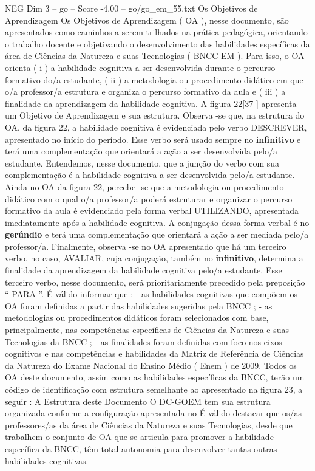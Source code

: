 \begin{textsample}{NEG Dim 3 – go – Score -4.00 – go/go\_em\_55.txt}  \label{ex:f3_neg_241}
Os Objetivos de Aprendizagem Os Objetivos de Aprendizagem ( OA ), nesse documento, são apresentados como caminhos a serem trilhados na prática pedagógica, orientando o trabalho docente e objetivando o desenvolvimento das habilidades específicas da área de Ciências da Natureza e suas Tecnologias ( BNCC-EM ).
Para isso, o OA orienta ( i ) a habilidade cognitiva a ser desenvolvida durante o percurso formativo do/a estudante, ( ii ) a metodologia ou procedimento didático em que o/a professor/a estrutura e organiza o percurso formativo da aula e ( iii ) a finalidade da aprendizagem da habilidade cognitiva.
A figura 22[37 ] apresenta um Objetivo de Aprendizagem e sua estrutura.
Observa -se que, na estrutura do OA, da figura 22, a habilidade cognitiva é evidenciada pelo verbo DESCREVER, apresentado no início do período.
Esse verbo será usado sempre no \textbf{infinitivo} e terá uma complementação que orientará a ação a ser desenvolvida pelo/a estudante.
Entendemos, nesse documento, que a junção do verbo com sua complementação é a habilidade cognitiva a ser desenvolvida pelo/a estudante.
Ainda no OA da figura 22, percebe -se que a metodologia ou procedimento didático com o qual o/a professor/a poderá estruturar e organizar o percurso formativo da aula é evidenciado pela forma verbal UTILIZANDO, apresentada imediatamente após a habilidade cognitiva.
A conjugação dessa forma verbal é no \textbf{gerúndio} e terá uma complementação que orientará a ação a ser mediada pelo/a professor/a.
Finalmente, observa -se no OA apresentado que há um terceiro verbo, no caso, AVALIAR, cuja conjugação, também no \textbf{infinitivo}, determina a finalidade da aprendizagem da habilidade cognitiva pelo/a estudante.
Esse terceiro verbo, nesse documento, será prioritariamente precedido pela preposição “ PARA ”.
É válido informar que : - as habilidades cognitivas que compõem os OA foram definidas a partir das habilidades sugeridas pela BNCC ; - as metodologias ou procedimentos didáticos foram selecionados com base, principalmente, nas competências específicas de Ciências da Natureza e suas Tecnologias da BNCC ; - as finalidades foram definidas com foco nos eixos cognitivos e nas competências e habilidades da Matriz de Referência de Ciências da Natureza do Exame Nacional do Ensino Médio ( Enem ) de 2009.
Todos os OA deste documento, assim como as habilidades específicas da BNCC, terão um código de identificação com estrutura semelhante ao apresentado na figura 23, a seguir : A Estrutura deste Documento O DC-GOEM tem sua estrutura organizada conforme a configuração apresentada no É válido destacar que os/as professores/as da área de Ciências da Natureza e suas Tecnologias, desde que trabalhem o conjunto de OA que se articula para promover a habilidade específica da BNCC, têm total autonomia para desenvolver tantas outras habilidades cognitivas.

\end{textsample}
